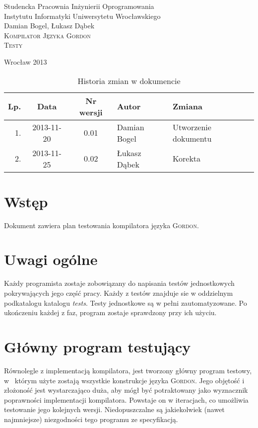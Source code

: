 \documentclass{documentation}
\begin{document}
\begin{titlepage}
\begin{center}
Studencka Pracownia Inżynierii Oprogramowania\\
Instytutu Informatyki Uniwersytetu Wrocławskiego\\[6cm]

Damian Bogel, Łukasz Dąbek\\[1cm]
\textsc{\LARGE Kompilator Języka Gordon}\\[0.5cm]
\textsc{\large Testy}

\vfill
Wrocław 2013 \\[2.5cm]

\end{center}
\end{titlepage}

\newpage
\begin{table}
	\centering
    \captionsetup{name=Tabela}
	\caption{Historia zmian w dokumencie}
		\begin{tabular}{|r|c|c|l|l|}
		\hline
		Lp.  & Data       & Nr wersji & Autor                 & Zmiana \\ \hline
		1.   & 2013-11-20 & 0.01 & Damian Bogel & Utworzenie dokumentu \\ \hline
		2.   & 2013-11-25 & 0.02 & Łukasz Dąbek & Korekta \\ \hline
	\end{tabular}
\end{table}
\newpage

\tableofcontents
\setcounter{page}{2}

\newpage

\section{Wstęp}
\noindent Dokument zawiera plan testowania kompilatora języka
\textsc{Gordon}.

\section{Uwagi ogólne}
\noindent Każdy programista zostaje zobowiązany do napisania testów
jednostkowych pokrywających jego część pracy. Każdy z testów znajduje sie w
oddzielnym podkatalogu katalogu \emph{tests}. Testy jednostkowe są w pełni
zautomatyzowane. Po ukończeniu każdej z faz, program zostaje sprawdzony przy
ich użyciu.

\section{Główny program testujący}
\noindent Równolegle z implementacją kompilatora, jest tworzony główny program
testowy, w~ którym użyte zostają wszystkie konstrukcje języka \textsc{Gordon}.
Jego objętość i złożoność jest wystarczająco duża, aby mógł być potraktowany
jako wyznacznik poprawności implementacji kompilatora. Powstaje on w iteracjach,
co umożliwia testowanie jego kolejnych wersji. Niedopuszczalne są
jakiekolwiek (nawet najmniejsze) niezgodności tego programu ze specyfikacją.
\end{document}
